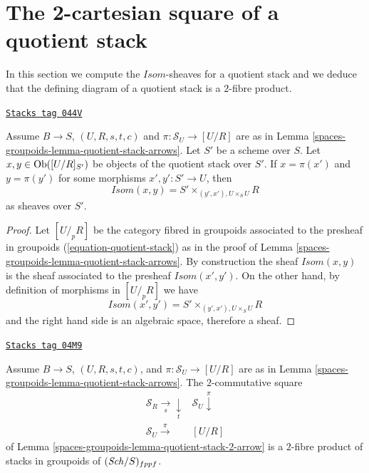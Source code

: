 \section{The 2-cartesian square of a quotient stack}
\label{spaces-groupoids-section-quotient-stack-2-cartesian}
In this section we compute the $\mathit{Isom}$-sheaves for a quotient stack
and we deduce that the defining diagram of a quotient stack is a
$2$-fibre product.

\begin{lemma}
\label{spaces-groupoids-lemma-quotient-stack-morphisms}
\href{https://stacks.math.columbia.edu/tag/044V}{\texttt{Stacks tag 044V}}

Assume $B \to S$, $(U, R, s, t, c)$ and $\pi : \mathcal{S}_U \to [U/R]$
are as in
Lemma \ref{spaces-groupoids-lemma-quotient-stack-arrows}.
Let $S'$ be a scheme over $S$.
Let $x, y \in \operatorname{Ob}([U/R]_{S'})$ be objects of the
quotient stack over $S'$. If $x = \pi(x')$ and $y = \pi(y')$ for
some morphisms $x', y' : S' \to U$, then
$$
\mathit{Isom}(x, y) = S' \times_{(y', x'), U \times_S U} R
$$
as sheaves over $S'$.
\end{lemma}

\begin{proof}
Let $[U/_{\!p}R]$ be the category fibred in groupoids associated to
the presheaf in groupoids (\ref{equation-quotient-stack}) as in the proof of
Lemma \ref{spaces-groupoids-lemma-quotient-stack-arrows}.
By construction the sheaf $\mathit{Isom}(x, y)$ is the sheaf associated
to the presheaf $\mathit{Isom}(x', y')$. On the other hand, by definition
of morphisms in $[U/_{\!p}R]$ we have
$$
\mathit{Isom}(x', y') = S' \times_{(y', x'), U \times_S U} R
$$
and the right hand side is an algebraic space, therefore a sheaf.
\end{proof}

\begin{lemma}
\label{spaces-groupoids-lemma-quotient-stack-2-cartesian}
\href{https://stacks.math.columbia.edu/tag/04M9}{\texttt{Stacks tag 04M9}}

Assume $B \to S$, $(U, R, s, t, c)$, and $\pi : \mathcal{S}_U \to [U/R]$
are as in
Lemma \ref{spaces-groupoids-lemma-quotient-stack-arrows}.
The $2$-commutative square
$$
\begin{array}{cc}\mathcal{S}_R \underset{s}{\longrightarrow}\underset{t}{\downarrow} & \mathcal{S}_U \overset{\pi}{\downarrow} \\ \mathcal{S}_U \overset{\pi}{\longrightarrow} & [U/R]\end{array}
$$
of
Lemma \ref{spaces-groupoids-lemma-quotient-stack-2-arrow}
is a $2$-fibre product of stacks in groupoids of $(\mathit{Sch}/S)_{fppf}$.
\end{lemma}

